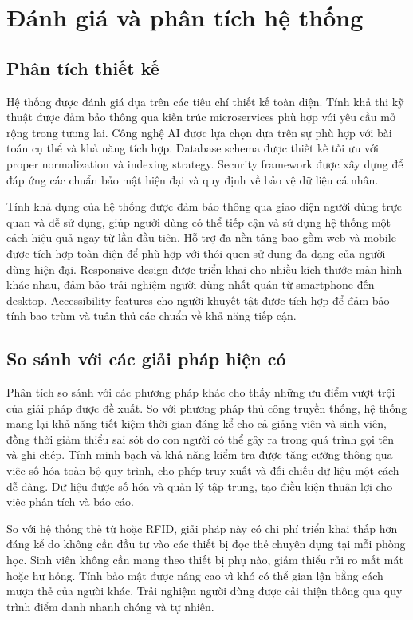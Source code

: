 \documentclass[12pt,a4paper]{report}
\begin{document}
\section{Đánh giá và phân tích hệ thống}
\subsection{Phân tích thiết kế}
Hệ thống được đánh giá dựa trên các tiêu chí thiết kế toàn diện. Tính khả thi kỹ thuật được đảm bảo thông qua kiến trúc microservices phù hợp với yêu cầu mở rộng trong tương lai. Công nghệ AI được lựa chọn dựa trên sự phù hợp với bài toán cụ thể và khả năng tích hợp. Database schema được thiết kế tối ưu với proper normalization và indexing strategy. Security framework được xây dựng để đáp ứng các chuẩn bảo mật hiện đại và quy định về bảo vệ dữ liệu cá nhân.

Tính khả dụng của hệ thống được đảm bảo thông qua giao diện người dùng trực quan và dễ sử dụng, giúp người dùng có thể tiếp cận và sử dụng hệ thống một cách hiệu quả ngay từ lần đầu tiên. Hỗ trợ đa nền tảng bao gồm web và mobile được tích hợp toàn diện để phù hợp với thói quen sử dụng đa dạng của người dùng hiện đại. Responsive design được triển khai cho nhiều kích thước màn hình khác nhau, đảm bảo trải nghiệm người dùng nhất quán từ smartphone đến desktop. Accessibility features cho người khuyết tật được tích hợp để đảm bảo tính bao trùm và tuân thủ các chuẩn về khả năng tiếp cận.

\subsection{So sánh với các giải pháp hiện có}
Phân tích so sánh với các phương pháp khác cho thấy những ưu điểm vượt trội của giải pháp được đề xuất. So với phương pháp thủ công truyền thống, hệ thống mang lại khả năng tiết kiệm thời gian đáng kể cho cả giảng viên và sinh viên, đồng thời giảm thiểu sai sót do con người có thể gây ra trong quá trình gọi tên và ghi chép. Tính minh bạch và khả năng kiểm tra được tăng cường thông qua việc số hóa toàn bộ quy trình, cho phép truy xuất và đối chiếu dữ liệu một cách dễ dàng. Dữ liệu được số hóa và quản lý tập trung, tạo điều kiện thuận lợi cho việc phân tích và báo cáo.

So với hệ thống thẻ từ hoặc RFID, giải pháp này có chi phí triển khai thấp hơn đáng kể do không cần đầu tư vào các thiết bị đọc thẻ chuyên dụng tại mỗi phòng học. Sinh viên không cần mang theo thiết bị phụ nào, giảm thiểu rủi ro mất mát hoặc hư hỏng. Tính bảo mật được nâng cao vì khó có thể gian lận bằng cách mượn thẻ của người khác. Trải nghiệm người dùng được cải thiện thông qua quy trình điểm danh nhanh chóng và tự nhiên.
\end{document}
